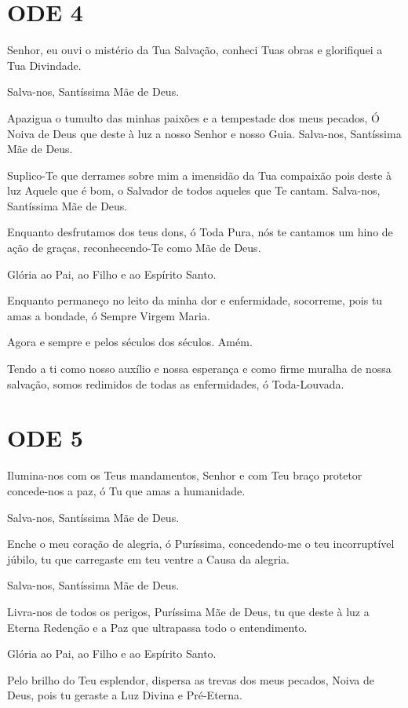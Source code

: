 \documentclass{subfiles}
\begin{document}
\section{ODE 4}

\eirmos{}Senhor, eu ouvi o mistério da Tua Salvação, conheci Tuas obras
e glorifiquei a Tua Divindade.

Salva-nos, Santíssima Mãe de Deus.

Apazigua o tumulto das minhas paixões e a tempestade dos meus
pecados, Ó Noiva de Deus que deste à luz a nosso Senhor e nosso Guia.
Salva-nos, Santíssima Mãe de Deus.

Suplico-Te que derrames sobre mim a imensidão da Tua compaixão
pois deste à luz Aquele que é bom, o Salvador de todos aqueles que Te cantam.
Salva-nos, Santíssima Mãe de Deus.

Enquanto desfrutamos dos teus dons, ó Toda Pura, nós te cantamos
um hino de ação de graças, reconhecendo-Te como Mãe de Deus.

Glória ao Pai, ao Filho e ao Espírito Santo.

Enquanto permaneço no leito da minha dor e enfermidade, socorreme, pois tu amas
a bondade, ó Sempre Virgem Maria.

Agora e sempre e pelos séculos dos séculos. Amém.

Tendo a ti como nosso auxílio e nossa esperança e como firme muralha
de nossa salvação, somos redimidos de todas as enfermidades, ó Toda-Louvada.

\section{ODE 5}

\eirmos{}Ilumina-nos com os Teus mandamentos, Senhor e com Teu
braço protetor concede-nos a paz, ó Tu que amas a humanidade.

Salva-nos, Santíssima Mãe de Deus.

Enche o meu coração de alegria, ó Puríssima, concedendo-me o teu
incorruptível júbilo, tu que carregaste em teu ventre a Causa da alegria.

Salva-nos, Santíssima Mãe de Deus.

Livra-nos de todos os perigos, Puríssima Mãe de Deus, tu que deste à
luz a Eterna Redenção e a Paz que ultrapassa todo o entendimento.

Glória ao Pai, ao Filho e ao Espírito Santo.

Pelo brilho do Teu esplendor, dispersa as trevas dos meus pecados,
Noiva de Deus, pois tu geraste a Luz Divina e Pré-Eterna.
\end{document}
